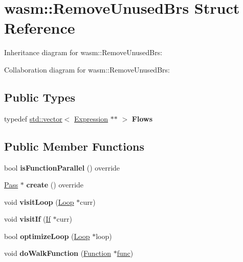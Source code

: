 \hypertarget{structwasm_1_1_remove_unused_brs}{}\section{wasm\+:\+:Remove\+Unused\+Brs Struct Reference}
\label{structwasm_1_1_remove_unused_brs}


Inheritance diagram for wasm\+:\+:Remove\+Unused\+Brs\+:


Collaboration diagram for wasm\+:\+:Remove\+Unused\+Brs\+:
\subsection*{Public Types}
\begin{DoxyCompactItemize}
\item 
\mbox{\label{structwasm_1_1_remove_unused_brs_a93b09750b0b75394f0bdef0fdb65fd8d}} 
typedef \mbox{\hyperlink{classstd_1_1vector}{std\+::vector}}$<$ \mbox{\hyperlink{classwasm_1_1_expression}{Expression}} $\ast$$\ast$ $>$ {\bfseries Flows}
\end{DoxyCompactItemize}
\subsection*{Public Member Functions}
\begin{DoxyCompactItemize}
\item 
\mbox{\label{structwasm_1_1_remove_unused_brs_a84e7ce164cab06b75e490e94fdce162b}} 
bool {\bfseries is\+Function\+Parallel} () override
\item 
\mbox{\label{structwasm_1_1_remove_unused_brs_a20110337941ef0dbaf76b17ede5a1325}} 
\mbox{\hyperlink{classwasm_1_1_pass}{Pass}} $\ast$ {\bfseries create} () override
\item 
\mbox{\label{structwasm_1_1_remove_unused_brs_a65a3e1db3ea3dc596ce328f24bb6cf0a}} 
void {\bfseries visit\+Loop} (\mbox{\hyperlink{classwasm_1_1_loop}{Loop}} $\ast$curr)
\item 
\mbox{\label{structwasm_1_1_remove_unused_brs_ae189a508256cc43e3d945e23e3b0ac3a}} 
void {\bfseries visit\+If} (\mbox{\hyperlink{classwasm_1_1_if}{If}} $\ast$curr)
\item 
\mbox{\label{structwasm_1_1_remove_unused_brs_abca94a396859dad21640cfd064a7a39e}} 
bool {\bfseries optimize\+Loop} (\mbox{\hyperlink{classwasm_1_1_loop}{Loop}} $\ast$loop)
\item 
\mbox{\label{structwasm_1_1_remove_unused_brs_a870bde9480f3950370d75a4bc109c937}} 
void {\bfseries do\+Walk\+Function} (\mbox{\hyperlink{classwasm_1_1_function}{Function}} $\ast$\mbox{\hyperlink{structfunc}{func}})
\end{DoxyCompactItemize}

